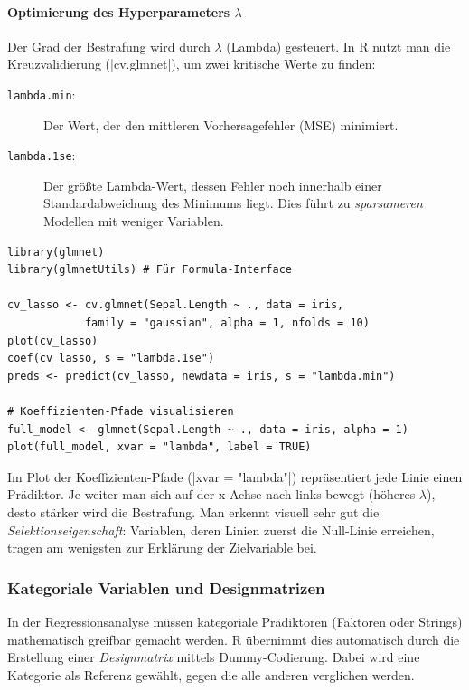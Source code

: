 \documentclass[10pt,twocolumn]{scrartcl}
\renewcommand{\lstinline}{\mycoloredinline}
\begin{document}
\paragraph{Optimierung des Hyperparameters $\lambda$}
Der Grad der Bestrafung wird durch $\lambda$ (Lambda) gesteuert. In R nutzt man die Kreuzvalidierung (\lstinline|cv.glmnet|), um zwei kritische Werte zu finden:
\begin{description}
\item[\texttt{lambda.min}:] Der Wert, der den mittleren Vorhersagefehler (MSE) minimiert.
\item[\texttt{lambda.1se}:] Der größte Lambda-Wert, dessen Fehler noch innerhalb einer Standardabweichung des Minimums liegt. Dies führt zu \emph{sparsameren} Modellen mit weniger Variablen.
\end{description}

\begin{lstlisting}
library(glmnet)
library(glmnetUtils) # Für Formula-Interface

cv_lasso <- cv.glmnet(Sepal.Length ~ ., data = iris, 
            family = "gaussian", alpha = 1, nfolds = 10)
plot(cv_lasso)
coef(cv_lasso, s = "lambda.1se")
preds <- predict(cv_lasso, newdata = iris, s = "lambda.min")

# Koeffizienten-Pfade visualisieren
full_model <- glmnet(Sepal.Length ~ ., data = iris, alpha = 1)
plot(full_model, xvar = "lambda", label = TRUE)
\end{lstlisting}

Im Plot der Koeffizienten-Pfade (\lstinline|xvar = "lambda"|) repräsentiert jede Linie einen Prädiktor. Je weiter man sich auf der x-Achse nach links bewegt (höheres $\lambda$), desto stärker wird die Bestrafung. Man erkennt visuell sehr gut die \emph{Selektionseigenschaft}: Variablen, deren Linien zuerst die Null-Linie erreichen, tragen am wenigsten zur Erklärung der Zielvariable bei.


\subsubsection{Kategoriale Variablen und Designmatrizen}

In der Regressionsanalyse müssen kategoriale Prädiktoren (Faktoren oder Strings) mathematisch greifbar gemacht werden. R übernimmt dies automatisch durch die Erstellung einer \emph{Designmatrix} mittels Dummy-Codierung. Dabei wird eine Kategorie als Referenz gewählt, gegen die alle anderen verglichen werden.
\end{document}

